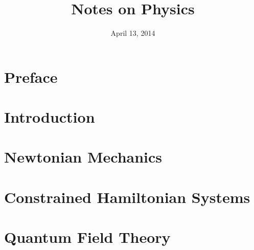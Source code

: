 \documentclass[oneside]{book}
\title{Notes on Physics}
\date{April 13, 2014}
\begin{document}
\frontmatter
\hypersetup{pageanchor=false}
\maketitle
\nocite{*}
\chapter{Preface}
\hypersetup{pageanchor=true}


\tableofcontents

\mainmatter
\chapter{Introduction}


\chapter{Newtonian Mechanics}


\chapter{Constrained Hamiltonian Systems}


\chapter{Quantum Field Theory}


\backmatter
\appendix
\printbibliography[heading=bibintoc]
\end{document}
